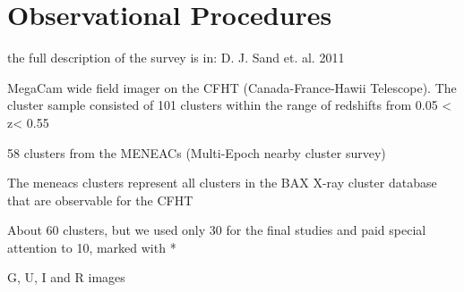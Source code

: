 
\chapter{Observational Procedures}

the full description of the survey is in: D. J. Sand et. al. 2011

MegaCam wide field imager on the CFHT (Canada-France-Hawii Telescope). The cluster sample consisted of 101 clusters within the range of redshifts from 0.05 < z< 0.55

58 clusters from the MENEACs (Multi-Epoch nearby cluster survey)

The meneacs clusters represent all clusters in the BAX X-ray cluster database that are observable for the CFHT

About 60 clusters, but we used only 30 for the final studies and paid special attention to 10, marked with *

G, U, I and R images


